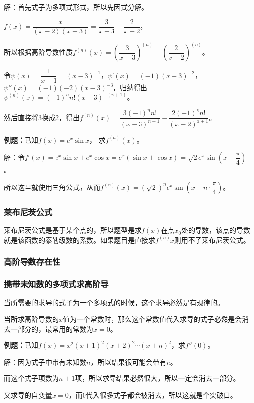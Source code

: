 解：首先式子为多项式形式，所以先因式分解。

$f(x)=\dfrac{x}{(x-2)(x-3)}=\dfrac{3}{x-3}-\dfrac{2}{x-2}$。

所以根据高阶导数性质$f^{(n)}(x)=\left(\dfrac{3}{x-3}\right)^{(n)}-\left(\dfrac{2}{x-2}\right)^{(n)}$。

令$\psi(x)=\dfrac{1}{x-1}=(x-3)^{-1}$，$\psi'(x)=(-1)(x-3)^{-2}$，$\psi''(x)=(-1)(-2)(x-3)^{-3}$，归纳得出$\psi^{(n)}(x)=(-1)^nn!(x-3)^{-(n+1)}$。

然后直接将3换成2，得出$f^{(n)}(x)=\dfrac{3(-1)^nn!}{(x-3)^{n+1}}-\dfrac{2(-1)^nn!}{(x-2)^{n+1}}$。

\textbf{例题：}已知$f(x)=e^x\sin x$， 求$f^{(n)}(x)$。

解：令$f'(x)=e^x\sin x+e^x\cos x=e^x(\sin x+\cos x)=\sqrt{2}e^x\sin\left(x+\dfrac{\pi}{4}\right)$。

所以这里就使用三角公式，从而$f^{(n)}(x)=(\sqrt{2})^ne^x\sin\left(x+n\cdot\dfrac{\pi}{4}\right)$。

\subsubsection{莱布尼茨公式}

莱布尼茨公式是基于某个点的，所以题型是求$f(x)$在点$x_0$处的导数，该点的导数就是该函数的泰勒级数的系数。如果题目是直接求$f^{(n)}x$则用不了莱布尼茨公式。

\subsubsection{高阶导数存在性}

\subsubsection{携带未知数的多项式求高阶导}

当所需要的求导的式子为一个多项式的时候，这个求导必然是有规律的。

当所求高阶导数的$x$值为一个常数时，那么这个常数值代入求导的式子必然是会消去一部分的，最常用的常数为$x=0$。

\textbf{例题：}已知$f(x)=x^2(x+1)^2(x+2)^2\cdots(x+n)^2$，求$f''(0)$。

解：因为式子中带有未知数$n$，所以结果很可能会带有$n$。

而这个式子项数为$n+1$项，所以求导结果必然很大，所以一定会消去一部分。

又求导的自变量$x=0$，而0代入很多式子都会被消去，所以这就是个突破口。

